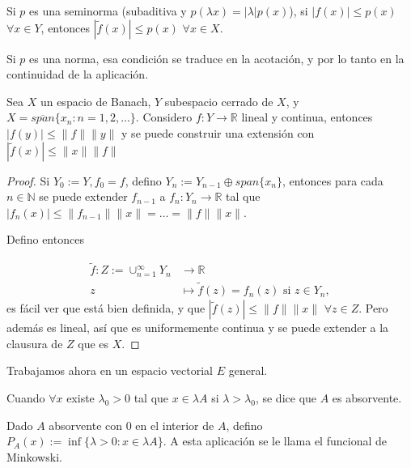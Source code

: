 \begin{corollary}
  Si $p$ es una seminorma (subaditiva y $p(\lambda x)=|\lambda|p(x)$), si
  $|f(x)|\le p(x)$ $\forall x\in Y$, entonces $|\tilde{f}(x)|\le p(x)$ $\forall
  x\in X$.
\end{corollary}

\begin{remark}
  Si $p$ es una norma, esa condición se traduce en la acotación, y por lo tanto
  en la continuidad de la aplicación.
\end{remark}

\begin{theorem}
  Sea $X$ un espacio de Banach, $Y$ subespacio cerrado de $X$, y
  $X=\overline{span} \{x_n:n=1,2,\ldots\} $. Considero $f:Y\to \mathbb{R}$ lineal
  y continua, entonces $|f(y)|\le \|f\|\|y\|$ y se puede construir una
  extensión con $|\tilde{f}(x)|\le \|x\|\|f\|$
\end{theorem}

\begin{proof}
  Si $Y_0:=Y,f_0=f$, defino $Y_n:=Y_{n-1}\oplus span \{x_n\}$, entonces para cada
  $n\in \mathbb{N}$ se puede extender $f_{n-1}$ a $f_n:Y_n\to \mathbb{R}$ tal
  que $|f_n(x)|\le \|f_{n-1}\|\|x\|=\ldots=\|f\|\|x\|$.

  Defino entonces

  \begin{align*}
    \tilde{f}: Z:=\cup_{n=1}^\infty Y_n &\longrightarrow \mathbb{R} \\
    z &\longmapsto \tilde{f}(z) = f_n(z) \text{ si } z\in Y_n
  ,\end{align*}
  es fácil ver que está bien definida, y que $|\tilde{f}(z)|\le \|f\|\|x\|$
  $\forall z\in Z$. Pero además es lineal, así que es uniformemente continua y
  se puede extender a la clausura de $Z$ que es $X$.
\end{proof}

Trabajamos ahora en un espacio vectorial $E$ general.

\begin{definition}
  Cuando $\forall x$ existe $\lambda_0>0$ tal que $x\in \lambda A$ si
  $\lambda>\lambda_0$, se dice que $A$ es absorvente.
\end{definition}

\begin{definition}
  Dado $A$ absorvente con $0$ en el interior de $A$, defino $P_A(x):= \inf \{\lambda>0:x\in
  \lambda A\} $. A esta aplicación se le llama el funcional de Minkowski.
\end{definition}

